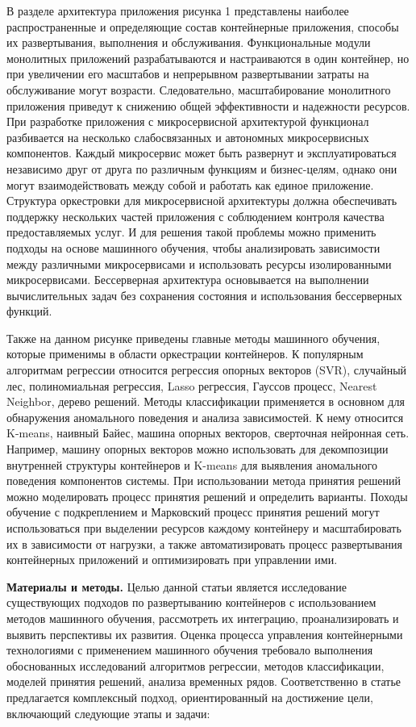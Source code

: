 \begin{multicols}{2}
В разделе архитектура приложения рисунка 1 представлены наиболее
распространенные и определяющие состав контейнерные приложения, способы
их развертывания, выполнения и обслуживания. Функциональные модули
монолитных приложений разрабатываются и настраиваются в один контейнер,
но при увеличении его масштабов и непрерывном развертывании затраты на
обслуживание могут возрасти. Следовательно, масштабирование монолитного
приложения приведут к снижению общей эффективности и надежности
ресурсов. При разработке приложения с микросервисной архитектурой
функционал разбивается на несколько слабосвязанных и автономных
микросервисных компонентов. Каждый микросервис может быть развернут и
эксплуатироваться независимо друг от друга по различным функциям и
бизнес-целям, однако они могут взаимодействовать между собой и работать
как единое приложение. Структура оркестровки для микросервисной
архитектуры должна обеспечивать поддержку нескольких частей приложения с
соблюдением контроля качества предоставляемых услуг. И для решения такой
проблемы можно применить подходы на основе машинного обучения, чтобы
анализировать зависимости между различными микросервисами и использовать
ресурсы изолированными микросервисами. Бессерверная архитектура
основывается на выполнении вычислительных задач без сохранения состояния
и использования бессерверных функций.

Также на данном рисунке приведены главные методы машинного обучения,
которые применимы в области оркестрации контейнеров. К популярным
алгоритмам регрессии относится регрессия опорных векторов (SVR),
случайный лес, полиномиальная регрессия, Lasso регрессия, Гауссов
процесс, Nearest Neighbor, дерево решений. Методы классификации
применяется в основном для обнаружения аномального поведения и анализа
зависимостей. К нему относится K-means, наивный Байес, машина опорных
векторов, сверточная нейронная сеть. Например, машину опорных векторов
можно использовать для декомпозиции внутренней структуры контейнеров и
K-means для выявления аномального поведения компонентов системы. При
использовании метода принятия решений можно моделировать процесс
принятия решений и определить варианты. Походы обучение с подкреплением
и Марковский процесс принятия решений могут использоваться при выделении
ресурсов каждому контейнеру и масштабировать их в зависимости от
нагрузки, а также автоматизировать процесс развертывания контейнерных
приложений и оптимизировать при управлении ими.

{\bfseries Материалы и методы.} Целью данной статьи является исследование
существующих подходов по развертыванию контейнеров с использованием
методов машинного обучения, рассмотреть их интеграцию, проанализировать
и выявить перспективы их развития. Оценка процесса управления
контейнерными технологиями с применением машинного обучения требовало
выполнения обоснованных исследований алгоритмов регрессии, методов
классификации, моделей принятия решений, анализа временных рядов.
Соответственно в статье предлагается комплексный подход, ориентированный
на достижение цели, включающий следующие этапы и задачи:


\end{multicols}
